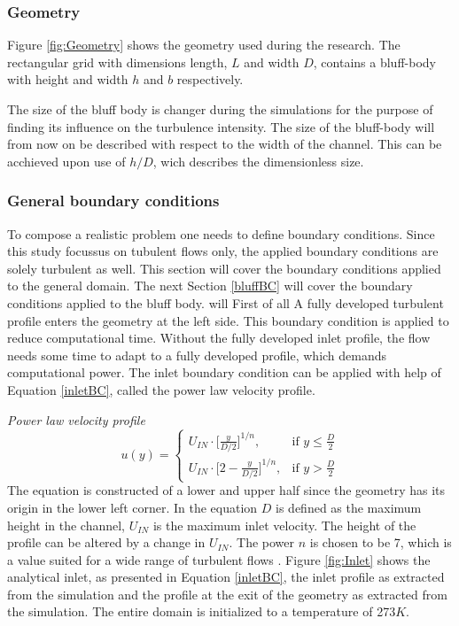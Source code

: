 \documentclass{CFD2017}
\begin{document}
\subsubsection{Geometry}
Figure \ref{fig:Geometry} shows the geometry used during the research. The rectangular grid with dimensions length, $L$ and width $D$, contains a bluff-body with height and width $h$ and $b$ respectively.


The size of the bluff body is changer during the simulations for the purpose of finding its influence on the turbulence intensity. The size of the bluff-body will from now on be described with respect to the width of the channel. This can be acchieved upon use of $h/D$, wich describes the dimensionless size.\\



\subsubsection{General boundary conditions}
To compose a realistic problem one needs to define boundary conditions. Since this study focussus on tubulent flows only, the applied boundary conditions are solely turbulent as well. This section will cover the boundary conditions applied to the general domain. The next Section \ref{bluffBC} will cover the boundary conditions applied to the bluff body.  will  First of all A fully developed turbulent profile enters the geometry at the left side. This boundary condition is applied to reduce computational time. Without the fully developed inlet profile, the flow needs some time to adapt to a fully developed profile, which demands computational power. The inlet boundary condition can be applied with help of Equation \ref{inletBC}, called the power law velocity profile. \vspace{2mm}

\emph{Power law velocity profile}
\begin{equation}
\label{inletBC}
u(y) = \begin{cases} U_{IN}\cdot \big[\frac{y}{D/2}\big]^{1/n}, & \mbox{if } y\leq\frac{D}{2} \\ U_{IN}\cdot \big[2-\frac{y}{D/2}\big]^{1/n}, & \mbox{if } y>\frac{D}{2}\end{cases}
\end{equation}
The equation is constructed of a lower and upper half since the geometry has its origin in the lower left corner. In the equation $D$ is defined as the maximum height in the channel, $U_{IN}$ is the maximum inlet velocity. The height of the profile can be altered by a change in $U_{IN}$. The power $n$ is chosen to be 7, which is a value suited for a wide range of turbulent flows \cite{Morrison}. Figure \ref{fig:Inlet} shows the analytical inlet, as presented in Equation \ref{inletBC}, the inlet profile as extracted from the simulation and the profile at the exit of the geometry as extracted from the simulation. The entire domain is initialized to a temperature of 273$K$.
\end{document}
